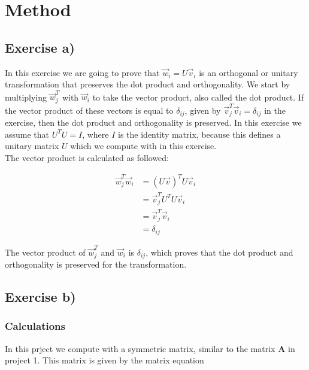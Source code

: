 \documentclass{article}
\begin{document}
\vspace{1cm}

\section{Method} \label{sec:Method}



\subsection{Exercise a)} \label{sec:Method a)}

In this exercise we are going to prove that $\vec{w}_i = U \vec{v}_i$ is an orthogonal or unitary transformation that preserves the dot product and orthogonality. We start by multiplying $\vec{w}_j ^T$ with $\vec{w}_i$ to take the vector product, also called the dot product. If the vector product of these vectors is equal to $\delta_{ij}$, given by $\vec{v}_j ^T \vec{v}_i = \delta_{ij}$ in the exercise, then the dot product and orthogonality is preserved. In this exercise we assume that $U^T U = I$, where $I$ is the identity matrix, because this defines a unitary matrix $U$ which we compute with in this exercise. \\

The vector product is calculated as followed:

\begin{align*}
  \vec{w}_j ^T \vec{w}_i &= (U \vec{v})^T U \vec{v}_i \\
  &= \vec{v}_j ^T U^T U \vec{v}_i \\
  &= \vec{v}_j ^T \vec{v}_i \\
  &= \delta _{ij}
\end{align*}

The vector product of $\vec{w}_j ^T$ and $\vec{w}_i$ is $\delta_{ij}$, which proves that the dot product and orthogonality is preserved for the transformation.


\subsection{Exercise b)} \label{sec:Method b)}

  \subsubsection{Calculations} \label{sec:Calculations b)}

  In this prject we compute with a symmetric matrix, similar to the matrix \textbf{A} in project 1. This matrix is given by the matrix equation
\end{document}
